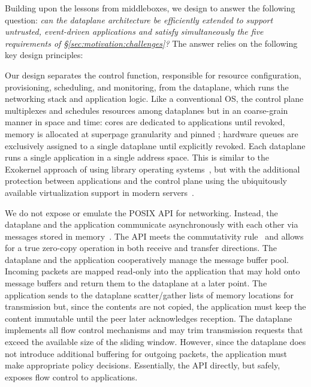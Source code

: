 
Building upon the lessons from middleboxes, we design \ix to answer
the following question: {\it can the dataplane architecture be
  efficiently extended to support untrusted, event-driven applications
  and satisfy simultaneously the five requirements of
  \S\ref{sec:motivation:challenges}?}  The answer relies on the
following key design principles:


Our design separates the control function, responsible for resource
configuration, provisioning, scheduling, and monitoring, from the
dataplane, which runs the networking stack and application logic.
Like a conventional OS, the control plane multiplexes and schedules
resources among dataplanes but in an coarse-grain manner in space and
time: cores are dedicated to applications until revoked, memory is
allocated at superpage  granularity and pinned ; hardware queues are
exclusively assigned to a single dataplane until explicitly revoked.
Each dataplane runs a single application in a single address space.
This is similar to the Exokernel approach of using library operating
systems~\cite{DBLP:conf/sosp/EnglerKO95}, but with the additional
protection between applications and the control plane using the
ubiquitously available virtualization support in modern
servers~\cite{DBLP:journals/computer/UhligNRSMABKLS05,belay2012dune}.

 We do
not expose or emulate the POSIX API for networking.  Instead, the
dataplane and the application communicate asynchronously with each
other via messages stored in
memory~\cite{rizzo2012netmap,han2012megapipe}.  The API meets the
commutativity rule~\cite{DBLP:conf/sosp/ClementsKZMK13} and allows for
a true zero-copy operation in both receive and transfer
directions. The dataplane and the application cooperatively manage the
message buffer pool. Incoming packets are mapped read-only into the
application that may hold onto message buffers and return them to the
dataplane at a later point.  The application sends to the dataplane
scatter/gather lists of memory locations for transmission but, since
the contents are not copied, the application must keep the content
immutable until the peer later acknowledges reception. The dataplane
implements all flow control mechanisms and may trim transmission
requests that exceed the available size of the sliding
window. However, since the dataplane does not introduce additional
buffering for outgoing packets, the application must make appropriate
policy decisions. Essentially, the API directly, but safely, exposes
flow control to applications.


